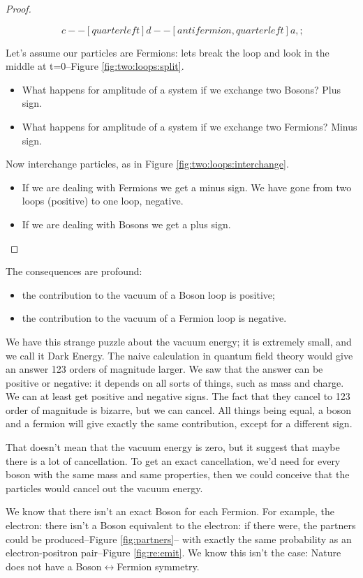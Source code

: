 \documentclass[]{article}
\begin{document}
\begin{proof}
\begin{figure}[H]
\begin{subfigure}[t]{0.45\textwidth}
\begin{equation*}
{					c-- [quarter left]
					d-- [anti fermion,quarter left] a,
				};
			\end{equation*}		
	\end{subfigure}
	\end{figure}
	Let's assume our particles are Fermions: lets break the loop and look in the middle at t=0--Figure \ref{fig:two:loops:split}. 
	\begin{itemize}
		\item What happens for amplitude of a system if we exchange two Bosons? Plus sign. 
		\item What happens for amplitude of a system if we exchange two Fermions? Minus sign. 
	\end{itemize}
	Now interchange particles, as in Figure \ref{fig:two:loops:interchange}.
	\begin{itemize}
		\item If we are dealing with Fermions we get a minus sign. We have gone from two loops (positive) to one loop, negative.
		\item If we are dealing with Bosons we get a plus sign.
	\end{itemize} 
\end{proof}

The consequences are profound:
\begin{itemize}
	\item the contribution to the vacuum of a Boson loop is positive;
	\item the contribution to the vacuum of a Fermion loop is negative.
\end{itemize}
We have this strange puzzle about the vacuum energy; it is extremely small, and we call it Dark Energy. The naive calculation in quantum field theory would give an answer 123 orders of magnitude larger.  We saw that the answer can be positive or negative: it depends on all sorts of things, such as mass and charge. We can at least get positive and negative signs. The fact that they cancel to 123 order of magnitude is bizarre, but we can cancel. All things being equal, a boson and a fermion will give exactly the same contribution, except for a different sign.

That doesn't mean that the vacuum energy is zero, but it suggest that maybe there is a lot of cancellation. To get an exact cancellation, we'd need for every boson with the same mass and same properties, then we could conceive that the particles would cancel out the vacuum energy.

We know that there isn't an exact Boson for each Fermion. For example, the electron: there isn't a Boson equivalent to the electron: if there were, the partners could be produced--Figure \ref{fig:partners}-- with exactly the same probability as an electron-positron pair--Figure \ref{fig:re:emit}. We know this isn't the case: Nature does not have a Boson$\leftrightarrow$Fermion symmetry.
\end{document}
